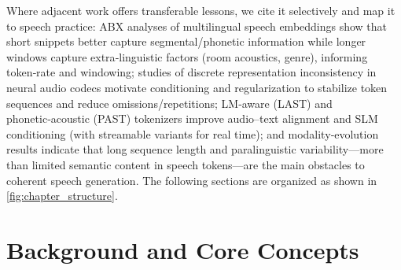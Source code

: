 Where adjacent work offers transferable lessons, we cite it selectively and map it to speech practice: ABX analyses of multilingual speech embeddings show that short snippets better capture segmental/phonetic information while longer windows capture extra‑linguistic factors (room acoustics, genre), informing token‑rate and windowing; studies of discrete representation inconsistency in neural audio codecs motivate conditioning and regularization to stabilize token sequences and reduce omissions/repetitions; LM‑aware (LAST) and phonetic‑acoustic (PAST) tokenizers improve audio–text alignment and SLM conditioning (with streamable variants for real time); and modality‑evolution results indicate that long sequence length and paralinguistic variability—more than limited semantic content in speech tokens—are the main obstacles to coherent speech generation. \cite{har-tuv2025pastphoneticacousticspeechtokenizer,turetzky2024lastlanguagemodelawarespeechtokenization,fily2024establishingdegreesclosenessbetweenaudio,wang2024whydospeechlanguagemodelsfailgeneratesem,liu2024analyzingmitigatinginconsistencydiscrete}The following sections are organized as shown in \autoref{fig:chapter_structure}.

















\section{Background and Core Concepts} \label{sec:Background and Core Concepts}

